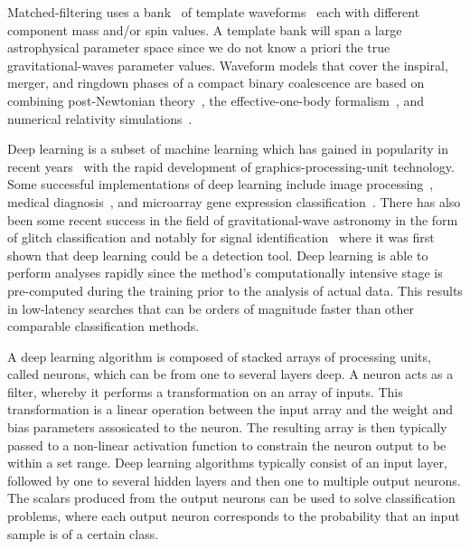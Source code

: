\documentclass[%
showpacs,
 amsmath,amssymb,
 aps,
 twocolumn,
 prl,
 reprint,
floatfix,
]{revtex4-1}
\begin{document}
%
%
Matched-filtering uses a bank~\cite{PhysRevD.86.084017,
1705.01845,PhysRevD.80.104014, PhysRevD.90.082004, PhysRevD.89.084041} of
template waveforms~\cite{PhysRevD.44.3819, PhysRevD.89.061502,
PhysRevD.89.024003, Blanchet2014} each with different component mass
and/or spin values. A template bank will span a large astrophysical parameter
space since we do not know a priori the true gravitational-waves parameter
values. Waveform models that cover the inspiral, merger, and ringdown phases of
a compact binary coalescence are based on combining post-Newtonian
theory~\cite{PhysRevD.84.049901,PhysRevD.80.084043,Blanchet2014,PhysRevD.93.084054},
the effective-one-body formalism~\cite{PhysRevD.59.084006}, and numerical
relativity simulations~\cite{PhysRevLett.95.121101}.

%
%
Deep learning is a subset of machine learning which has gained in popularity in
recent years~\cite{NIPS2012_4824, 1406.2661, 1409.1556, 1412.7062, 1311.2901,
1409.4842} with the rapid development of graphics-processing-unit technology.
Some successful implementations of deep learning include image processing~\cite{1603.08511,1412.2306,NIPS2012_4824}, medical
diagnosis~\cite{KONONENKO200189}, and microarray gene expression
classification~\cite{Pirooznia2008}. There has also been
some recent success in the field of gravitational-wave astronomy in the form of
glitch classification \cite{PhysRevD.95.104059,
0264-9381-34-6-064003,1706.07446} and notably for signal
identification~\cite{1701.00008} where it was first shown that deep learning
could be a detection tool. Deep learning is able to
perform analyses rapidly since the method's computationally intensive
stage is pre-computed during the training prior to the analysis of actual data.
This results in low-latency searches that can be orders of magnitude
faster than other comparable classification methods. 

%
%
A deep learning algorithm is composed of stacked arrays of processing units,
called neurons, which can be from one to several layers deep. A neuron
acts as a filter, whereby it performs a transformation on an array of inputs.
This transformation is a linear operation between the input array and the
weight and bias parameters assosicated to the neuron. The resulting array is
then typically passed to a non-linear activation function to constrain the
neuron output to be within a set range. Deep learning algorithms typically
consist of an input layer, followed by one to several hidden layers and then
one to multiple output neurons. The scalars produced from the output neurons
can be used to solve classification problems, where each output neuron
corresponds to the probability that an input sample is of a certain
class.
\end{document}
